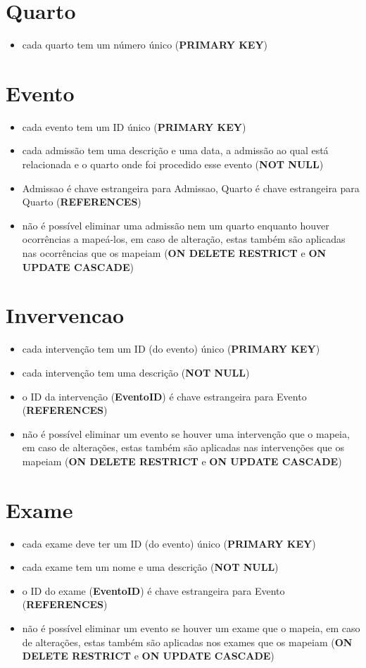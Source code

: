 \documentclass[article, a4paper, 12pt, oneside]{memoir}
\begin{document}
\section*{Quarto}
\begin{itemize}
	\item cada quarto tem um número único (\textbf{PRIMARY KEY})
\end{itemize}

\section*{Evento}
\begin{itemize}
	\item cada evento tem um ID único (\textbf{PRIMARY KEY})
	\item cada admissão tem uma descrição e uma data, a admissão ao qual está relacionada e o quarto onde foi procedido esse evento (\textbf{NOT NULL})
	\item Admissao é chave estrangeira para Admissao, Quarto é chave estrangeira para Quarto (\textbf{REFERENCES})
	\item não é possível eliminar uma admissão nem um quarto enquanto houver ocorrências a mapeá-los, em caso de alteração, estas também são aplicadas nas ocorrências que os mapeiam (\textbf{ON DELETE RESTRICT} e \textbf{ON UPDATE CASCADE})
\end{itemize}

\section*{Invervencao}
\begin{itemize}
	\item cada intervenção tem um ID (do evento) único (\textbf{PRIMARY KEY})
	\item cada intervenção tem uma descrição (\textbf{NOT NULL})
	\item o ID da intervenção (\textbf{EventoID}) é chave estrangeira para Evento (\textbf{REFERENCES})
	\item não é possível eliminar um evento se houver uma intervenção que o mapeia, em caso de alterações, estas também são aplicadas nas intervenções que os mapeiam (\textbf{ON DELETE RESTRICT} e \textbf{ON UPDATE CASCADE})
\end{itemize}

\section*{Exame}
\begin{itemize}
	\item cada exame deve ter um ID (do evento) único (\textbf{PRIMARY KEY})
	\item cada exame tem um nome e uma descrição (\textbf{NOT NULL})
	\item o ID do exame (\textbf{EventoID}) é chave estrangeira para Evento (\textbf{REFERENCES})
	\item não é possível eliminar um evento se houver um exame que o mapeia, em caso de alterações, estas também são aplicadas nos exames que os mapeiam (\textbf{ON DELETE RESTRICT} e \textbf{ON UPDATE CASCADE})
\end{itemize}
\end{document}
